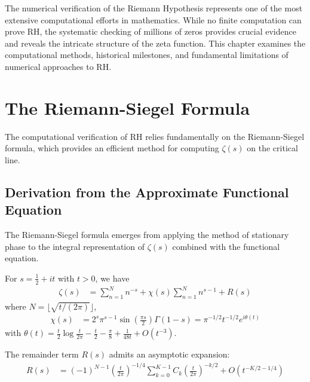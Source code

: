 \label{ch:computational}

The numerical verification of the Riemann Hypothesis represents one of the most extensive computational efforts in mathematics. While no finite computation can prove RH, the systematic checking of millions of zeros provides crucial evidence and reveals the intricate structure of the zeta function. This chapter examines the computational methods, historical milestones, and fundamental limitations of numerical approaches to RH.

\section{The Riemann-Siegel Formula}
\label{sec:riemann-siegel}

The computational verification of RH relies fundamentally on the Riemann-Siegel formula, which provides an efficient method for computing $\zeta(s)$ on the critical line.

\subsection{Derivation from the Approximate Functional Equation}

The Riemann-Siegel formula emerges from applying the method of stationary phase to the integral representation of $\zeta(s)$ combined with the functional equation.

\begin{theorem}
For $s = \frac{1}{2} + it$ with $t > 0$, we have
\begin{align}
\zeta(s) &= \sum_{n=1}^{N} n^{-s} + \chi(s) \sum_{n=1}^{N} n^{s-1} + R(s)
\end{align}
where $N = \lfloor\sqrt{t/(2\pi)}\rfloor$, 
\begin{align}
\chi(s) &= 2^s \pi^{s-1} \sin\left(\frac{\pi s}{2}\right) \Gamma(1-s) = \pi^{-1/2} t^{-1/2} e^{i\theta(t)}
\end{align}
with $\theta(t) = \frac{t}{2}\log\frac{t}{2\pi} - \frac{t}{2} - \frac{\pi}{8} + \frac{1}{48t} + O(t^{-3})$.
\end{theorem}

The remainder term $R(s)$ admits an asymptotic expansion:
\begin{align}
R(s) &= (-1)^{N-1} \left(\frac{t}{2\pi}\right)^{-1/4} \sum_{k=0}^{K-1} C_k \left(\frac{t}{2\pi}\right)^{-k/2} + O(t^{-K/2-1/4})
\end{align}

